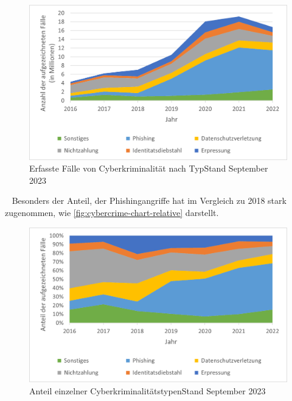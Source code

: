 \begin{figure}[htpb]
    \centering
    \includegraphics[width = 0.75\linewidth]{src/abbildungen/Aufgezeichnete_Cyberkriminalitaet}
    \caption[Erfasste Fälle von Cyberkriminalität nach Typ]{Erfasste Fälle von Cyberkriminalität nach Typ\footnotemark\newline Stand September 2023}
    \label{fig:cybercrime-chart-absolute}
\end{figure}\ 
Besonders der Anteil, der Phishingangriffe hat im Vergleich zu 2018 stark zugenommen, wie \autoref{fig:cybercrime-chart-relative} darstellt.
\begin{figure}[htpb]
    \centering
    \includegraphics[width = 0.75\linewidth]{src/abbildungen/Anteile_Cyberkriminalitaet}
    \caption[Anteil einzelner Cyberkriminalitätstypen]{Anteil einzelner Cyberkriminalitätstypen\footnotemark\newline Stand September 2023}
    \label{fig:cybercrime-chart-relative}
\end{figure}\ 

